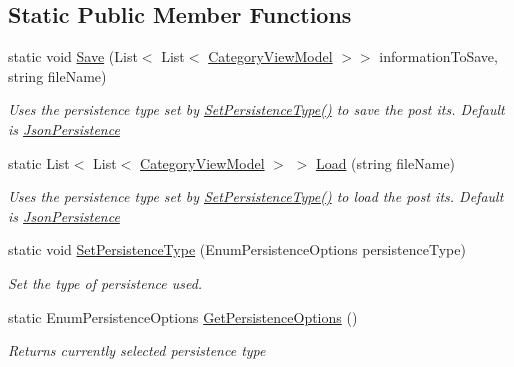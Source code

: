 \subsection*{Static Public Member Functions}
\begin{DoxyCompactItemize}
\item 
static void \hyperlink{class_kanban_board_1_1_persistence_1_1_persistence_handler_a868a7554ddbb067280b79d3f91abcb0c}{Save} (List$<$ List$<$ \hyperlink{class_kanban_board_1_1_view_model_1_1_category_view_model}{Category\+View\+Model} $>$$>$ information\+To\+Save, string file\+Name)
\begin{DoxyCompactList}\small\item\em Uses the persistence type set by \hyperlink{class_kanban_board_1_1_persistence_1_1_persistence_handler_a3fd5c28d09ade9618010f89167b72a86}{Set\+Persistence\+Type()} to save the post its. Default is \hyperlink{class_kanban_board_1_1_persistence_1_1_persistence_handler_1_1_json_persistence}{Json\+Persistence} \end{DoxyCompactList}\item 
static List$<$ List$<$ \hyperlink{class_kanban_board_1_1_view_model_1_1_category_view_model}{Category\+View\+Model} $>$ $>$ \hyperlink{class_kanban_board_1_1_persistence_1_1_persistence_handler_a71a5355e5b5a3f2f910527dca8b60a03}{Load} (string file\+Name)
\begin{DoxyCompactList}\small\item\em Uses the persistence type set by \hyperlink{class_kanban_board_1_1_persistence_1_1_persistence_handler_a3fd5c28d09ade9618010f89167b72a86}{Set\+Persistence\+Type()} to load the post its. Default is \hyperlink{class_kanban_board_1_1_persistence_1_1_persistence_handler_1_1_json_persistence}{Json\+Persistence} \end{DoxyCompactList}\item 
static void \hyperlink{class_kanban_board_1_1_persistence_1_1_persistence_handler_a3fd5c28d09ade9618010f89167b72a86}{Set\+Persistence\+Type} (Enum\+Persistence\+Options persistence\+Type)
\begin{DoxyCompactList}\small\item\em Set the type of persistence used. \end{DoxyCompactList}\item 
static Enum\+Persistence\+Options \hyperlink{class_kanban_board_1_1_persistence_1_1_persistence_handler_a5ac8e076f0238a233f6a0cee5190b01a}{Get\+Persistence\+Options} ()
\begin{DoxyCompactList}\small\item\em Returns currently selected persistence type \end{DoxyCompactList}\end{DoxyCompactItemize}


